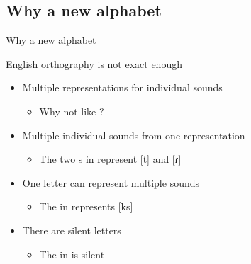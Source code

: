 \documentclass{beamer}
\newcommand{\subtwotwo}{Why a new alphabet}
\begin{document}
    \subsection{\subtwotwo}
      \begin{frame}{\subtwotwo}
        \begin{block}{English orthography is not exact enough}
          \begin{itemize}
            \item Multiple representations for individual sounds
            \begin{itemize}
              \item Why not  like ?
            \end{itemize}
            \item Multiple individual sounds from one representation
            \begin{itemize}
              \item The two s in  represent [t] and [ɾ]
            \end{itemize}
            \item One letter can represent multiple sounds
            \begin{itemize}
              \item The  in  represents [ks]
            \end{itemize}
            \item There are silent letters
            \begin{itemize}
              \item The  in  is silent
            \end{itemize}
          \end{itemize}
        \end{block}
      \end{frame}
\end{document}
